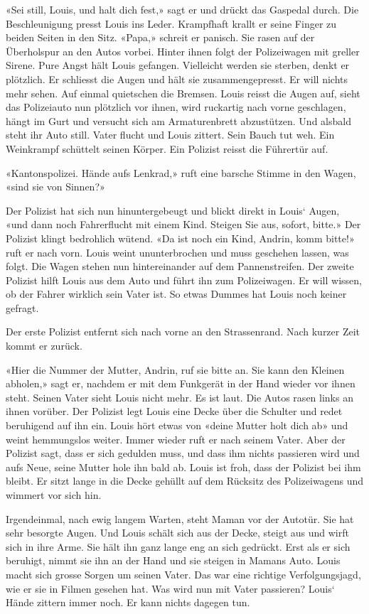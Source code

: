 «Sei still, Louis, und halt dich fest,» sagt er und drückt das Gaspedal
durch. Die Beschleunigung presst Louis ins Leder. Krampfhaft krallt er
seine Finger zu beiden Seiten in den Sitz. «Papa,» schreit er panisch.
Sie rasen auf der Überholspur an den Autos vorbei. Hinter ihnen folgt
der Polizeiwagen mit greller Sirene. Pure Angst hält Louis gefangen.
Vielleicht werden sie sterben, denkt er plötzlich. Er schliesst die
Augen und hält sie zusammengepresst. Er will nichts mehr sehen. Auf
einmal quietschen die Bremsen. Louis reisst die Augen auf, sieht das
Polizeiauto nun plötzlich vor ihnen, wird ruckartig nach vorne
geschlagen, hängt im Gurt und versucht sich am Armaturenbrett
abzustützen. Und alsbald steht ihr Auto still. Vater flucht und Louis
zittert. Sein Bauch tut weh. Ein Weinkrampf schüttelt seinen Körper. Ein
Polizist reisst die Führertür auf.

«Kantonspolizei. Hände aufs Lenkrad,» ruft eine barsche Stimme in den
Wagen, «sind sie von Sinnen?»

Der Polizist hat sich nun hinuntergebeugt und blickt direkt in Louis`
Augen, «und dann noch Fahrerflucht mit einem Kind. Steigen Sie aus,
sofort, bitte.» Der Polizist klingt bedrohlich wütend. «Da ist noch ein
Kind, Andrin, komm bitte!» ruft er nach vorn. Louis weint ununterbrochen
und muss geschehen lassen, was folgt. Die Wagen stehen nun
hintereinander auf dem Pannenstreifen. Der zweite Polizist hilft Louis
aus dem Auto und führt ihn zum Polizeiwagen. Er will wissen, ob der
Fahrer wirklich sein Vater ist. So etwas Dummes hat Louis noch keiner
gefragt.

Der erste Polizist entfernt sich nach vorne an den Strassenrand. Nach
kurzer Zeit kommt er zurück.

«Hier die Nummer der Mutter, Andrin, ruf sie bitte an. Sie kann den
Kleinen abholen,» sagt er, nachdem er mit dem Funkgerät in der Hand
wieder vor ihnen steht. Seinen Vater sieht Louis nicht mehr. Es ist
laut. Die Autos rasen links an ihnen vorüber. Der Polizist legt Louis
eine Decke über die Schulter und redet beruhigend auf ihn ein. Louis
hört etwas von «deine Mutter holt dich ab» und weint hemmungslos weiter.
Immer wieder ruft er nach seinem Vater. Aber der Polizist sagt, dass er
sich gedulden muss, und dass ihm nichts passieren wird und aufs Neue,
seine Mutter hole ihn bald ab. Louis ist froh, dass der Polizist bei ihm
bleibt. Er sitzt lange in die Decke gehüllt auf dem Rücksitz des
Polizeiwagens und wimmert vor sich hin.

Irgendeinmal, nach ewig langem Warten, steht Maman vor der Autotür. Sie
hat sehr besorgte Augen. Und Louis schält sich aus der Decke, steigt aus
und wirft sich in ihre Arme. Sie hält ihn ganz lange eng an sich
gedrückt. Erst als er sich beruhigt, nimmt sie ihn an der Hand und sie
steigen in Mamans Auto. Louis macht sich grosse Sorgen um seinen Vater.
Das war eine richtige Verfolgungsjagd, wie er sie in Filmen gesehen hat.
Was wird nun mit Vater passieren? Louis` Hände zittern immer noch. Er
kann nichts dagegen tun.

